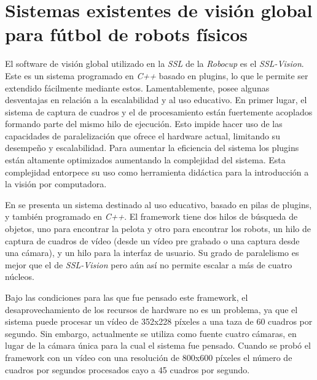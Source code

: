 
\section{Sistemas existentes de visión global para fútbol de robots físicos}


El software de visión global utilizado en la \emph{SSL} de la \emph{Robocup} es
el \emph{SSL-Vision}\cite{sslvision}. Este es un sistema programado en
\emph{C++} basado en plugins, lo que le permite ser extendido fácilmente
mediante estos. Lamentablemente, posee algunas desventajas en relación a la
escalabilidad y al uso educativo. En primer lugar, el sistema de captura de
cuadros y el de procesamiento están fuertemente acoplados formando parte del
mismo hilo de ejecución. Esto impide hacer uso de las capacidades de
paralelización que ofrece el hardware actual, limitando su desempeño y
escalabilidad. Para aumentar la eficiencia del sistema los plugins están
altamente optimizados aumentando la complejidad del sistema. Esta complejidad
entorpece su uso como herramienta didáctica para la introducción a la visión por
computadora.

En \cite{torres2014} se presenta un sistema destinado al uso educativo, basado
en pilas de plugins, y también programado en \emph{C++}. El framework tiene dos
hilos de búsqueda de objetos, uno para encontrar la pelota y otro para encontrar
los robots, un hilo de captura de cuadros de vídeo (desde un vídeo pre grabado o
una captura desde una cámara), y un hilo para la interfaz de usuario. Su grado
de paralelismo es mejor que el de \emph{SSL-Vision} pero aún así no permite
escalar a más de cuatro núcleos.

Bajo las condiciones para las que fue pensado este framework, el
desaprovechamiento de los recursos de hardware no es un problema, ya que el
sistema puede procesar un vídeo de 352x228 píxeles a una taza de 60 cuadros por
segundo. Sin embargo, actualmente se utiliza como fuente cuatro cámaras, en
lugar de la cámara única para la cual el sistema fue pensado. Cuando se probó el
framework con un vídeo con una resolución de 800x600 píxeles el número de
cuadros por segundos procesados cayo a 45 cuadros por segundo.
